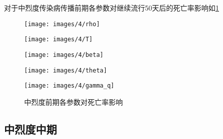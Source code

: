 \documentclass[withoutpreface,bwprint]{cumcmthesis}
\begin{document}
对于中烈度传染病传播前期各参数对继续流行50天后的死亡率影响如\cref{fig:9}
\begin{figure}[H]
    \centering
    \begin{minipage}[c]{0.3\textwidth}
        \centering
        \texttt{[image: images/4/rho]}
        \subcaption{$\rho$}
    \end{minipage}
    \begin{minipage}[c]{0.3\textwidth}
        \centering
        \texttt{[image: images/4/T]}
    \end{minipage}
    \begin{minipage}[c]{0.3\textwidth}
        \centering
        \texttt{[image: images/4/beta]}
        \subcaption{$\beta$}
    \end{minipage}

    \begin{minipage}[c]{0.3\textwidth}
        \centering
        \texttt{[image: images/4/theta]}
        \subcaption{$\theta$}
    \end{minipage}
    \begin{minipage}[c]{0.3\textwidth}
        \centering
        \texttt{[image: images/4/gamma\_q]}
    \end{minipage}
    \caption{中烈度前期各参数对死亡率影响}
    \label{fig:9}

\end{figure}

\subsection{中烈度中期}
\end{document}
